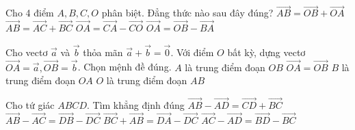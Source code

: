 \begin{ex}%
	Cho 4 điểm $A, B, C, O$ phân biệt. Đẳng thức nào sau đây đúng?
	\choice
	{$\overrightarrow{AB}=\overrightarrow{OB}+\overrightarrow{OA}$}
	{$\overrightarrow{AB}=\overrightarrow{AC}+\overrightarrow{BC}$}
	{\True $\overrightarrow{OA}=\overrightarrow{CA}-\overrightarrow{CO}$}
	{$\overrightarrow{OA}=\overrightarrow{OB}-\overrightarrow{BA}$}
	
\end{ex}

\begin{ex}%
	Cho vectơ $\overrightarrow{a}$ và $\overrightarrow{b}$ thỏa mãn $\overrightarrow{a}+\overrightarrow{b}=\overrightarrow{0}$. Với điểm $O$ bất kỳ, dựng vectơ $\overrightarrow{OA}=\overrightarrow{a},\overrightarrow{OB}=\overrightarrow{b}$. Chọn mệnh đề đúng.
	\choice
	{$A$ là trung điểm đoạn $OB$}
	{$\overrightarrow{OA}=\overrightarrow{OB}$}
	{$B$ là trung điểm đoạn $OA$}
	{\True $O$ là trung điểm đoạn $AB$}
\end{ex}

\begin{ex}
	Cho tứ giác ${ABCD}$. Tìm khẳng định đúng 
	\choice
	{ $\overrightarrow{AB}-\overrightarrow{AD}=\overrightarrow{CD}+\overrightarrow{BC}$ }
	{ \True $\overrightarrow{AB}-\overrightarrow{AC}=\overrightarrow{DB}-\overrightarrow{DC}$ }
	{ $\overrightarrow{BC}+\overrightarrow{AB}=\overrightarrow{DA}-\overrightarrow{DC}$ }
	{ $\overrightarrow{AC}-\overrightarrow{AD}=\overrightarrow{BD}-\overrightarrow{BC}$ }
	\end{ex}

